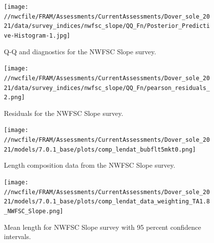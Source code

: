 \documentclass[11pt,
  english,
  a4paper,
]{article}
\begin{document}
\tagmcend\tagstructend

\newpage


\begin{figure}
\centering
\texttt{[image: //nwcfile/FRAM/Assessments/CurrentAssessments/Dover\_sole\_2021/data/survey\_indices/nwfsc\_slope/QQ\_Fn/Posterior\_Predictive-Histogram-1.jpg]}
\caption{Q-Q and diagnostics for the NWFSC Slope survey.\label{fig:nwfsc-qq}}
\end{figure}

\tagmcend\tagstructend

\newpage


\begin{figure}
\centering
\texttt{[image: //nwcfile/FRAM/Assessments/CurrentAssessments/Dover\_sole\_2021/data/survey\_indices/nwfsc\_slope/QQ\_Fn/pearson\_residuals\_2.png]}
\caption{Residuals for the NWFSC Slope survey.\label{fig:nwfsc-resid}}
\end{figure}

\tagmcend\tagstructend


\begin{figure}
\centering
\texttt{[image: //nwcfile/FRAM/Assessments/CurrentAssessments/Dover\_sole\_2021/models/7.0.1\_base/plots/comp\_lendat\_bubflt5mkt0.png]}
\caption{Length composition data from the NWFSC Slope survey.\label{fig:nw-slope-len-data}}
\end{figure}

\tagmcend\tagstructend


\begin{figure}
\centering
\texttt{[image: //nwcfile/FRAM/Assessments/CurrentAssessments/Dover\_sole\_2021/models/7.0.1\_base/plots/comp\_lendat\_data\_weighting\_TA1.8\_NWFSC\_Slope.png]}
\caption{Mean length for NWFSC Slope survey with 95 percent confidence intervals.\label{fig:mean-nw-slope-len-data}}
\end{figure}

\tagmcend\tagstructend
\end{document}
